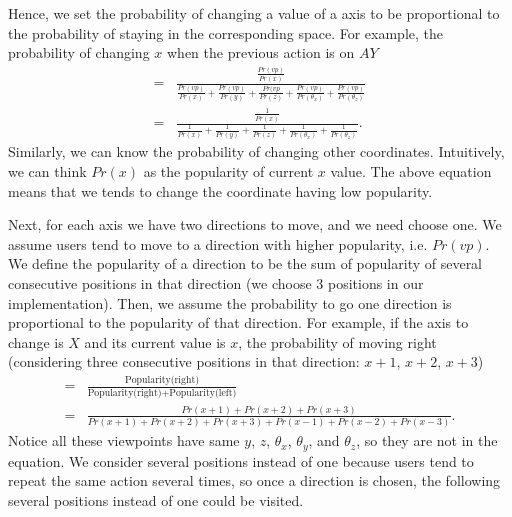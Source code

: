 Hence, we set the probability of changing a value of a axis to be proportional to the probability of staying in the
corresponding space. For example, the probability of changing $x$ when the previous action is on $AY$
\begin{align*}
    =&\frac{\frac{Pr(vp)}{Pr(x)}}
            {\frac{Pr(vp)}{Pr(x)}
            +\frac{Pr(vp)}{Pr(y)}
            +\frac{Pr(vp}{Pr(z)}
            +\frac{Pr(vp)}{Pr(\theta_x)}
            +\frac{Pr(vp)}{Pr(\theta_z)}}\\
    =& \frac{\frac{1}{Pr(x)}}
            {\frac{1}{Pr(x)}
            +\frac{1}{Pr(y)}
            +\frac{1}{Pr(z)}
            +\frac{1}{Pr(\theta_x)}
            +\frac{1}{Pr(\theta_z)}
            }.
\end{align*}
Similarly, we can know the probability of changing other coordinates. Intuitively, we can think $Pr(x)$ as 
the popularity of current $x$ value. The above equation means that we tends to change the coordinate having low
popularity.


Next, for each axis we have two directions to move, and we need choose one.
We assume users tend to move to a direction with higher popularity, i.e. $Pr(vp)$. 
We define the popularity of a direction to be the sum of popularity of several consecutive positions in that direction
(we choose 3 positions in our implementation). 
Then, we assume the probability to go one direction is proportional to the popularity of that direction.
For example, if the axis to change is $X$ and its current value is $x$, 
the probability of moving right (considering three consecutive positions in that direction: $x+1$, $x+2$, $x+3$)
\begin{align*}
    =&\frac{\textrm{Popularity(right)}}
    {\textrm{Popularity(right)} + \textrm{Popularity(left)}} \\
   =&\frac{Pr(x+1)+Pr(x+2)+Pr(x+3)}
          {Pr(x+1)+Pr(x+2)+Pr(x+3)+Pr(x-1)+Pr(x-2)+Pr(x-3)}.
\end{align*}
Notice all these viewpoints have same $y$, $z$, $\theta_x$, $\theta_y$, and $\theta_z$, so they are not in
the equation. We consider several positions instead of one because users tend to repeat the same action several times,
so once a direction is chosen, the following several positions instead of one could be visited. 

